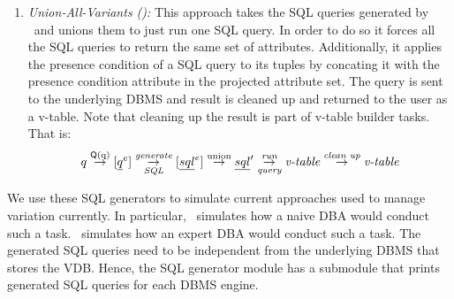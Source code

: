 \begin{enumerate}
\item
\emph{Union-All-Variants (\uav):}
This approach takes the SQL queries generated by \ubf\ and 
unions them to just run one SQL query. In order to do so it 
forces all the SQL queries to return the same set of attributes.
Additionally, it applies the presence condition of a SQL query
to its tuples by concating it with the presence condition attribute
in the projected attribute set.
The query is sent to the underlying
DBMS and result is cleaned up and returned to the user as a v-table. Note that cleaning up
the result is part of v-table builder tasks.
That is:
%
\[\vQ \mathrel{\mathop{\rightarrow}^{\mathrm{\qGroup \vQ}}} [ \annot [\dimMeta] {\pQ} ] 
\mathrel{\mathop{\rightarrow}^{\mathrm{\textit{generate}}}_{\mathrm{\textit{SQL}}}} [ \annot [\dimMeta] {\sqlQ} ]
\mathrel{\mathop{\rightarrow}^{\mathrm{union}}} {\VVal \sqlQ}
\mathrel{\mathop{\rightarrow}^{\mathrm{\textit{run}}}_{\mathrm{\textit{query}}}} \textit{v-table}
\mathrel{\mathop{\rightarrow}^{\mathrm{\textit{clean up}}}} \textit{v-table}
\]

\end{enumerate}

We use these
SQL generators to simulate current approaches used to manage
variation currently. In particular, \nbf\ simulates how a naive
DBA would conduct such a task. \ubf\ simulates
how an expert DBA would conduct such a task. 
The generated SQL queries need to be independent from the 
underlying DBMS that stores the VDB. Hence, the SQL generator module
has a submodule that prints generated SQL queries for each DBMS engine. 


